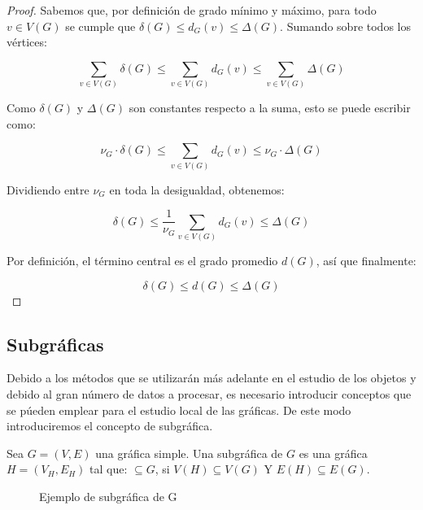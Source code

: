 \begin{proof}
    Sabemos que, por definición de grado mínimo y máximo, para todo $v \in V(G)$ se cumple que $\delta(G) \leq d_G(v) \leq \Delta(G)$. Sumando sobre todos los vértices:

    \[
    \sum_{v \in V(G)} \delta(G) \leq \sum_{v \in V(G)} d_G(v) \leq \sum_{v \in V(G)} \Delta(G)
    \]

    Como $\delta(G)$ y $\Delta(G)$ son constantes respecto a la suma, esto se puede escribir como:

    \[
    \nu_G \cdot \delta(G) \leq \sum_{v \in V(G)} d_G(v) \leq \nu_G \cdot \Delta(G)
    \]

    Dividiendo entre $\nu_G$ en toda la desigualdad, obtenemos:

    \[
    \delta(G) \leq \frac{1}{\nu_G} \sum_{v \in V(G)} d_G(v) \leq \Delta(G)
    \]

    Por definición, el término central es el grado promedio $d(G)$, así que finalmente:

    \[
    \delta(G) \leq d(G) \leq \Delta(G)
    \]
\end{proof}



\subsection{Subgráficas}

Debido a los métodos que se utilizarán más adelante en el estudio de los objetos y debido al gran número de datos a procesar, es necesario introducir conceptos que se púeden emplear para el estudio local de las gráficas. De este modo introduciremos el concepto de subgráfica. 
\begin{definition}[Subgráfica]
Sea $G = (V,E)$ una gráfica simple. Una subgráfica de $G$ es una gráfica $H = (V_H,E_H)$ tal que: $\subseteq G $, si $V(H) \subseteq  V(G)$ Y $E(H) \subseteq E(G)$.
\end{definition}

\begin{example}
\begin{center}
\begin{figure}[h]
    \centering
    \caption{Ejemplo de subgráfica de G}
    \label{fig:SG}
\end{figure}
\end{center}
    
\end{example}

